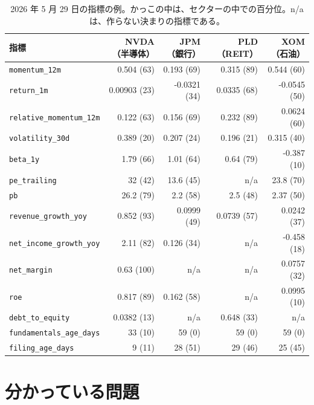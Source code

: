 \documentclass[xelatex,ja=standard,jafont=hiragino-pron,a4paper,10pt]{bxjsreport}
\begin{document}
\begin{table}[htbp]
\centering
\caption{2026 年 5 月 29 日の指標の例。かっこの中は、セクターの中での百分位。n/a は、作らない決まりの指標である。}
\label{tab:stockex}
{\small
\begin{tabular}{lrrrr}
\toprule
指標 & NVDA（半導体） & JPM（銀行） & PLD（REIT） & XOM（石油） \\
\midrule
\texttt{momentum\_\allowbreak{}12m} & 0.504 (63) & 0.193 (69) & 0.315 (89) & 0.544 (60) \\
\texttt{return\_\allowbreak{}1m} & 0.00903 (23) & -0.0321 (34) & 0.0335 (68) & -0.0545 (50) \\
\texttt{relative\_\allowbreak{}momentum\_\allowbreak{}12m} & 0.122 (63) & 0.156 (69) & 0.232 (89) & 0.0624 (60) \\
\texttt{volatility\_\allowbreak{}30d} & 0.389 (20) & 0.207 (24) & 0.196 (21) & 0.315 (40) \\
\texttt{beta\_\allowbreak{}1y} & 1.79 (66) & 1.01 (64) & 0.64 (79) & -0.387 (10) \\
\texttt{pe\_\allowbreak{}trailing} & 32 (42) & 13.6 (45) & n/a & 23.8 (70) \\
\texttt{pb} & 26.2 (79) & 2.2 (58) & 2.5 (48) & 2.37 (50) \\
\texttt{revenue\_\allowbreak{}growth\_\allowbreak{}yoy} & 0.852 (93) & 0.0999 (49) & 0.0739 (57) & 0.0242 (37) \\
\texttt{net\_\allowbreak{}income\_\allowbreak{}growth\_\allowbreak{}yoy} & 2.11 (82) & 0.126 (34) & n/a & -0.458 (18) \\
\texttt{net\_\allowbreak{}margin} & 0.63 (100) & n/a & n/a & 0.0757 (32) \\
\texttt{roe} & 0.817 (89) & 0.162 (58) & n/a & 0.0995 (10) \\
\texttt{debt\_\allowbreak{}to\_\allowbreak{}equity} & 0.0382 (13) & n/a & 0.648 (33) & n/a \\
\texttt{fundamentals\_\allowbreak{}age\_\allowbreak{}days} & 33 (10) & 59 (0) & 59 (0) & 59 (0) \\
\texttt{filing\_\allowbreak{}age\_\allowbreak{}days} & 9 (11) & 28 (51) & 29 (46) & 25 (45) \\
\bottomrule
\end{tabular}
}
\end{table}

\section{分かっている問題}
\end{document}

